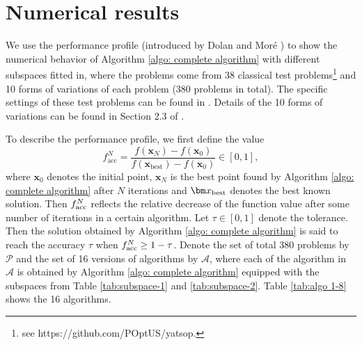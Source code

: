 \documentclass[colorlinks=true, linkcolor=blue, citecolor=blue, urlcolor=blue]{article}
\theoremstyle{plain}
\theoremstyle{definition}
\theoremstyle{remark}
\begin{document}
\section{Numerical results}\label{section: numerical results}
We use the performance profile (introduced by Dolan and Mor\'{e} \cite{EDD01}) %
to show the numerical behavior of Algorithm \ref{algo: complete algorithm} with different subspaces fitted in, where the problems come from 38 classical test problems\footnote{see https://github.com/POptUS/yatsop.} and 10 forms of variations of each problem (380 problems in total). The specific settings of these test problems can be found in \citet{YATSOp2025}.
{\color{black}Details of the 10 forms of variations can be found in Section 2.3 of \cite{xie2025remuregionalminimalupdating}.
} 

To describe the performance profile, we first define the value
\[f_{\mathrm{acc}}^{N}=\frac{f(\bm{x}_{N})-f(\bm{x}_{0})}{f(\bm{x}_{\text{best}})-f(\bm{x}_{0})} \in [0,1],
\]
where $\bm x_0$ denotes the initial point, $\bm x_N$ is the best point found by Algorithm \ref{algo: complete algorithm} after $N$ iterations 
and $\bm x_{\rm best}$ denotes the best known solution. Then $f_{\rm acc}^N$ reflects the relative decrease of the function value after some number of iterations in a certain algorithm. Let $\tau \in[0,1]$ denote the tolerance. Then the solution obtained by Algorithm \ref{algo: complete algorithm} is said to reach the accuracy $\tau$ when $f_{\rm acc}^{N}\geq 1-\tau$. 
Denote the set of total 380 problems by $\mathcal{P}$ and the set of 16 versions of algorithms by $\mathcal{A}$, where each of the algorithm in $\mathcal{A}$ is obtained by Algorithm \ref{algo: complete algorithm} equipped with the subspaces from Table \ref{tab:subspace-1} and \ref{tab:subspace-2}. Table \ref{tab:algo 1-8} shows the 16 algorithms.
\end{document}
